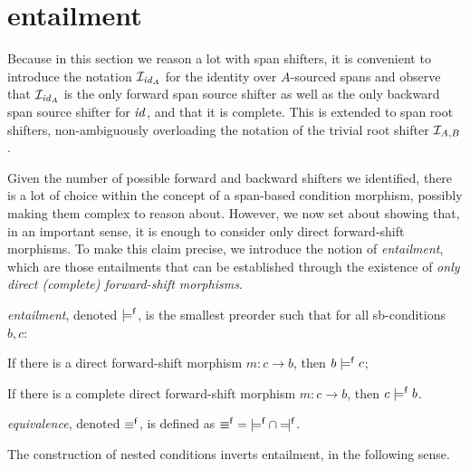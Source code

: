 \section{{\fprovable} entailment}

Because in this section we reason a lot with span shifters, it is convenient to introduce the notation $\mathcal{I}_{\mathit{id}_A}$ for the identity over $A$-sourced spans and observe that $\mathcal{I}_{\mathit{id}_A}$ is the only forward span source shifter as well as the only backward span source shifter for $\mathit{id}$, and that it is complete. This is extended to span root shifters, non-ambiguously overloading the notation of the trivial root shifter $\mathcal{I}_{A,B}$.

Given the number of possible forward and backward shifters we identified, there is a lot of choice within the concept of a span-based condition morphism, possibly making them complex to reason about. However, we now set about showing that, in an important sense, it is enough to consider only direct forward-shift morphisms. To make this claim precise, we introduce the notion of \emph{{\fprovable} entailment}, which are those entailments that can be established through the existence of \emph{only direct (complete) forward-shift morphisms}.

\begin{definition}
\emph{{\fprovable} entailment}, denoted $\models^{\mathsf f}$, is the smallest preorder such that for all sb-conditions $b,c$:
\begin{itemizeS}
\item If there is a direct forward-shift morphism $m:c\to b$, then $b\models^{\mathsf f} c$;
\item If there is a complete direct forward-shift morphism $m:c\to b$, then $c\models^{\mathsf f} b$.
\end{itemizeS}
\emph{{\fprovable} equivalence}, denoted $\equiv^{\mathsf f}$, is defined as ${\pequiv}={\pentails}\cap{\pentailedby}$.
\end{definition}
%
The construction of nested conditions inverts {\fprovable} entailment, in the following sense.

